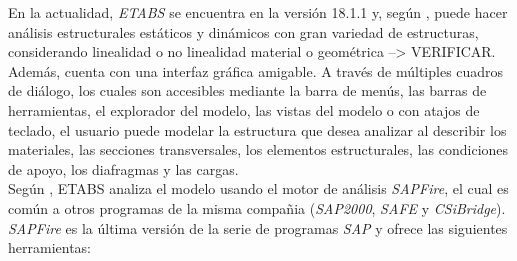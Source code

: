 En la actualidad, \emph{ETABS} se encuentra en la versión 18.1.1 y, según \cite{ETABS2020systemrequirements}, puede hacer análisis estructurales estáticos y dinámicos con gran variedad de estructuras, {\color{red}considerando linealidad o no linealidad material o geométrica --> VERIFICAR}. Además, cuenta con una interfaz gráfica amigable. A través de múltiples cuadros de diálogo, los cuales son accesibles mediante la barra de menús, las barras de herramientas, el explorador del modelo, las vistas del modelo o con atajos de teclado, el usuario puede modelar la estructura que desea analizar al describir los materiales, las secciones transversales, los elementos estructurales, las condiciones de apoyo, los diafragmas y las cargas.\\






Según \cite{ETABS2017analysisreferencemanual}, ETABS analiza el modelo usando el motor de análisis \emph{SAPFire}, el cual es común a otros programas de la misma compañia (\emph{SAP2000}, \emph{SAFE} y \emph{CSiBridge}). \emph{SAPFire} es la última versión de la serie de programas \emph{SAP} y ofrece las siguientes herramientas:

